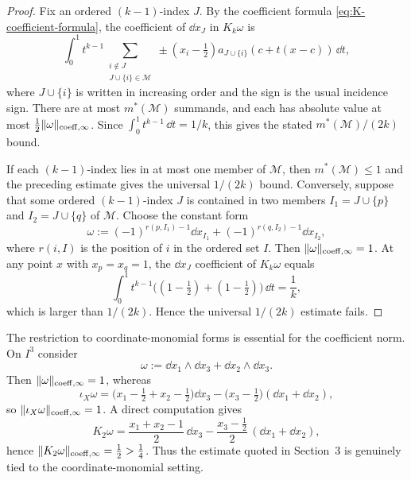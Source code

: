 \begin{proof}
Fix an ordered $(k-1)$-index $J$. By the coefficient formula
\eqref{eq:K-coefficient-formula}, the coefficient of $\dd x_J$ in $K_k\omega$
is
\[
\int_0^1t^{k-1}
\sum_{\substack{i\notin J\\ J\cup\{i\}\in\mathcal M}}
\pm (x_i-\tfrac12)a_{J\cup\{i\}}(c+t(x-c))\,\dd t,
\]
where $J\cup\{i\}$ is written in increasing order and the sign is the usual
incidence sign. There are at most $m^*(\mathcal M)$ summands, and each has
absolute value at most $\frac12\lVert \omega \rVert_{\mathrm{coeff},\infty}$. Since
$\int_0^1t^{k-1}\,\dd t=1/k$, this gives the stated
$m^*(\mathcal M)/(2k)$ bound.

If each $(k-1)$-index lies in at most one member of $\mathcal M$, then
$m^*(\mathcal M)\le1$ and the preceding estimate gives the universal
$1/(2k)$ bound. Conversely, suppose that some ordered $(k-1)$-index $J$ is
contained in two members $I_1=J\cup\{p\}$ and $I_2=J\cup\{q\}$ of
$\mathcal M$. Choose the constant form
\[
\omega:=(-1)^{r(p,I_1)-1}\dd x_{I_1}
+(-1)^{r(q,I_2)-1}\dd x_{I_2},
\]
where $r(i,I)$ is the position of $i$ in the ordered set $I$. Then
$\lVert \omega \rVert_{\mathrm{coeff},\infty}=1$. At any point $x$ with $x_p=x_q=1$, the
$\dd x_J$ coefficient of $K_k\omega$ equals
\[
\int_0^1t^{k-1}\bigl((1-\tfrac12)+(1-\tfrac12)\bigr)\,\dd t
=\frac1k,
\]
which is larger than $1/(2k)$. Hence the universal $1/(2k)$ estimate fails.
\end{proof}

\begin{remark}
\label{rem:non-coord-monomial}
The restriction to coordinate-monomial forms is essential for the coefficient
norm. On $I^3$ consider
\[
\omega:=\dd x_1\wedge \dd x_3+\dd x_2\wedge \dd x_3.
\]
Then $\lVert \omega \rVert_{\mathrm{coeff},\infty}=1$, whereas
\[
\iota_X\omega
=
\bigl(x_1-\tfrac12+x_2-\tfrac12\bigr)\dd x_3
-\bigl(x_3-\tfrac12\bigr)(\dd x_1+\dd x_2),
\]
so $\lVert \iota_X\omega \rVert_{\mathrm{coeff},\infty}=1$. A direct computation gives
\[
K_2\omega
=
\frac{x_1+x_2-1}{2}\,\dd x_3
-\frac{x_3-\tfrac12}{2}\,(\dd x_1+\dd x_2),
\]
hence $\lVert K_2\omega \rVert_{\mathrm{coeff},\infty}=\frac12>\frac14$. Thus the estimate
quoted in Section~3 is genuinely tied to the coordinate-monomial setting.
\end{remark}

